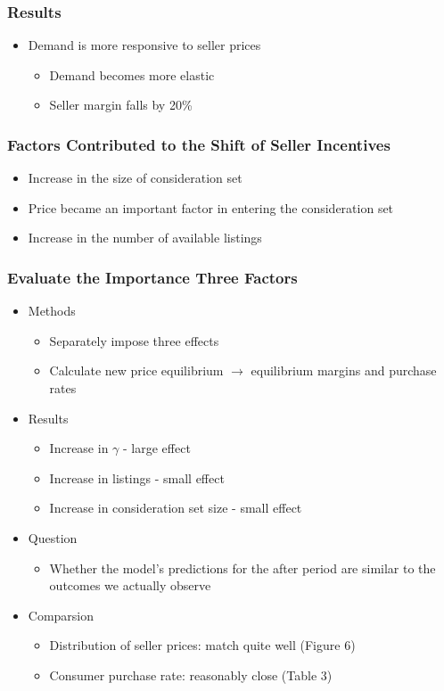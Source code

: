 \documentclass{beamer}
\begin{document}
\begin{frame}
\frametitle{Results}
\begin{itemize}
\item Demand is more responsive to seller prices
  \begin{itemize}
  \item Demand becomes more elastic
  \item Seller margin falls by 20\%
  \end{itemize}
\end{itemize}
\end{frame}

\begin{frame}
\frametitle{Factors Contributed to the Shift of Seller Incentives}
\begin{itemize}
\item Increase in the size of consideration set
\item Price became an important factor in entering the consideration set
\item Increase in the number of available listings
\end{itemize}
\end{frame}

\begin{frame}[allowframebreaks]
\frametitle{Evaluate the Importance Three Factors}
\begin{itemize}
\item Methods
\begin{itemize}
\item Separately impose three effects
\item Calculate new price equilibrium $\to$ equilibrium margins and purchase rates
\end{itemize}
\item Results
  \begin{itemize}
  \item Increase in $\gamma$ - large effect
  \item Increase in listings - small effect
  \item Increase in consideration set size - small effect
  \end{itemize}
\framebreak
\item Question
  \begin{itemize}
  \item Whether the model's predictions for the after period are similar to the outcomes we actually observe
  \end{itemize}
\item Comparsion
  \begin{itemize}
  \item Distribution of seller prices: match quite well (Figure 6)
  \item Consumer purchase rate: reasonably close (Table 3) 
  \end{itemize}
\end{itemize}
\end{frame}
\end{document}
